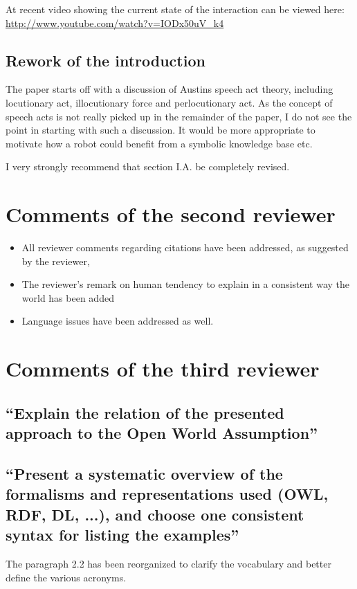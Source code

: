 \documentclass{article}
\begin{document}
At recent video showing the current state of the interaction can be viewed
here: \url{http://www.youtube.com/watch?v=IODx50uV_k4}

\subsection{Rework of the introduction} The paper starts off with a discussion
of Austins speech act theory, including locutionary act, illocutionary force
and perlocutionary act. As the concept of speech acts is not really picked up
in the remainder of the paper, I do not see the point in starting with such a
discussion. It would be more appropriate to motivate how a robot could benefit
from a symbolic knowledge base etc.

I very strongly recommend that section I.A. be completely revised.


\section{Comments of the second reviewer}

\begin{itemize}
\item All reviewer comments regarding citations have been addressed, as suggested by the reviewer,
\item The reviewer's remark on human tendency to explain in a consistent way the world has been added
\item Language issues have been addressed as well.
\end{itemize}

\section{Comments of the third reviewer}

\subsection{``Explain the relation of the presented approach to the Open World
Assumption''}


\subsection{``Present a systematic overview of the formalisms and
representations used (OWL, RDF, DL, ...), and choose one consistent syntax for
listing the examples''}

The paragraph 2.2 has been reorganized to clarify the vocabulary and better
define the various acronyms.
\end{document}
